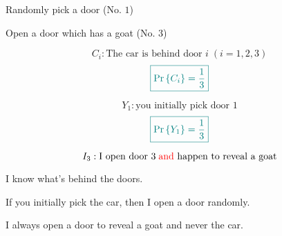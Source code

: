 
\begin{frame}{}
  \centerline{}

  \pause
  \vspace{-0.40cm}
  \begin{description}[(S)he]
    \centering
    \item[You:] Randomly pick a door (No. $1$)
    \item[I:] Open a door which has a goat (No. $3$) \\
  \end{description}

  \pause
  \vspace{0.30cm}
  \centerline{}
\end{frame}

\begin{frame}{}
  \[
    C_i: \text{The car is behind door } i\; (i = 1, 2, 3)
  \]
  \[
    \textcolor{teal}{\boxed{\Pr\left\{C_i\right\} = \frac{1}{3}}}
  \]

  \pause
  \centerline{}

  \pause
  \vspace{0.50cm}
  \[
    Y_1: \text{you initially pick door } 1
  \]
  \[
    \textcolor{teal}{\boxed{\Pr\left\{Y_1\right\} = \frac{1}{3}}}
  \]

  \pause
  \centerline{}
\end{frame}

\begin{frame}{}
  \[
    I_3: \text{I open door } 3 \text{\;\textcolor{red}{and} happen to reveal a goat}
  \]

  \vspace{0.50cm}
  \begin{description}
    \setlength{\itemsep}{8pt}
    \item<2->[\purple{\textsc{Assumption}:}]
      I know what's behind the doors.
    \item<3->[\purple{\textsc{Assumption}:}]
      If you initially pick the car, then I open a door randomly.
    \item<4->[\purple{\textsc{Assumption}:}]
      I always open a door to reveal a goat and never the car.
  \end{description}

\end{frame}

